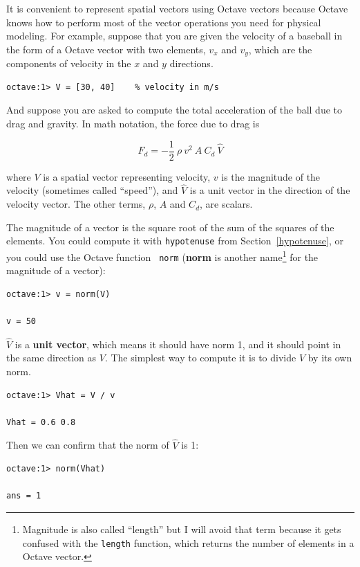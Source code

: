 \documentclass{book}
\begin{document}
It is convenient to represent spatial vectors using Octave vectors
because Octave knows how to perform most of the vector
operations you need for physical modeling. For example,
suppose that you are given the velocity of a baseball in
the form of a Octave vector with two elements, $v_x$ and $v_y$,
which are the components of velocity in the $x$ and $y$ directions.

\begin{verbatim}
octave:1> V = [30, 40]    % velocity in m/s
\end{verbatim}

And suppose you are asked to compute the total acceleration of
the ball due to drag and gravity. In math notation, the force
due to drag is

\[ F_d = -\frac{1}{2} ~ \rho ~ v^2 ~ A ~ C_d ~ \hat{V}  \]

where $V$ is a spatial vector representing velocity, $v$ is the magnitude
of the velocity (sometimes called ``speed''), and $\hat{V}$ is a unit
vector in the direction of the velocity vector. The other terms,
$\rho$, $A$ and $C_d$, are scalars.

The magnitude of a vector is the square root of the sum of the squares
of the elements. You could compute it with {\tt hypotenuse} from
Section~\ref{hypotenuse}, or you could use the Octave function {\tt
norm} ({\bf norm} is another name\footnote{Magnitude is also called
``length'' but I will avoid that term because it gets confused with
the {\tt length} function, which returns the number of elements in a
Octave vector.} for the magnitude of a vector):

\begin{verbatim}
octave:1> v = norm(V)

v = 50
\end{verbatim}

$\hat{V}$ is a {\bf unit vector}, which means it should have norm 1,
and it should point in the same direction as $V$. The simplest
way to compute it is to divide $V$ by its own norm.

\begin{verbatim}
octave:1> Vhat = V / v

Vhat = 0.6 0.8
\end{verbatim}

Then we can confirm that the norm of $\hat{V}$ is 1:

\begin{verbatim}
octave:1> norm(Vhat)

ans = 1
\end{verbatim}
\end{document}

